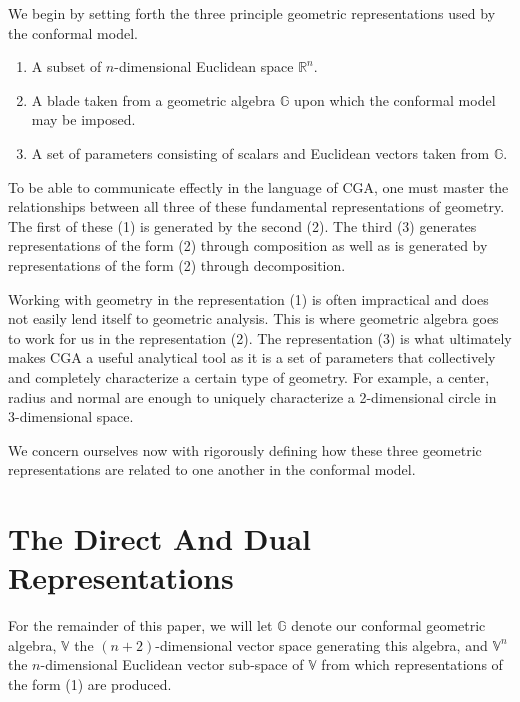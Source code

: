 \documentclass{ecgd-l}
\theoremstyle{definition}
\theoremstyle{remark}
\numberwithin{equation}{section}
\newcommand{\G}{\mathbb{G}}
\newcommand{\V}{\mathbb{V}}
\newcommand{\R}{\mathbb{R}}
\begin{document}
We begin by setting forth the three principle geometric representations used by
the conformal model.
\begin{enumerate}
\item A subset of $n$-dimensional Euclidean space $\R^n$.
\item A blade taken from a geometric algebra $\G$ upon which the conformal model may be imposed.
\item A set of parameters consisting of scalars and Euclidean vectors taken from $\G$.
\end{enumerate}
To be able to communicate effectly in the language of CGA, one must master the
relationships between all three of these fundamental representations of geometry.
The first of these (1) is generated by the second (2).  The third (3) generates representations
of the form (2) through composition as well as is generated by representations of the form (2)
through decomposition.

Working with geometry in the representation (1) is often impractical and does not easily lend itself to
geometric analysis.  This is where geometric algebra goes to work for us in the representation (2).
The representation (3) is what ultimately makes CGA a useful analytical tool as it is a set
of parameters that collectively and completely characterize a certain type of geometry.
For example, a center, radius and normal are enough to uniquely characterize a 2-dimensional
circle in 3-dimensional space.

We concern ourselves now with rigorously defining how these three geometric representations
are related to one another in the conformal model.

\section{The Direct And Dual Representations}

For the remainder of this paper, we will let $\G$ denote our conformal geometric algebra,
$\V$ the $(n+2)$-dimensional vector space generating this algebra, and $\V^n$ the
$n$-dimensional Euclidean vector sub-space of $\V$ from which representations of the form (1)
are produced.


\end{document}
